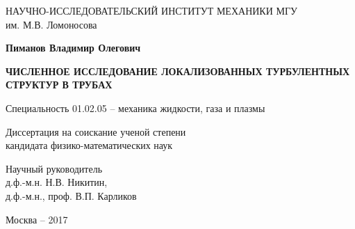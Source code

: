 \begin{titlepage}
\newpage

\begin{center}
НАУЧНО-ИССЛЕДОВАТЕЛЬСКИЙ ИНСТИТУТ МЕХАНИКИ МГУ \\
им. М.В. Ломоносова\\
\vspace{2cm}
\end{center}


\vspace{2.5cm}

\begin{center}
\textbf{Пиманов Владимир Олегович}
\end{center}

\vspace{1cm}

\begin{center}
\textbf{ЧИСЛЕННОЕ ИССЛЕДОВАНИЕ ЛОКАЛИЗОВАННЫХ 
ТУРБУЛЕНТНЫХ СТРУКТУР В ТРУБАХ}
\end{center}

\vspace{1.5cm}

\begin{center}
Специальность 01.02.05 -- механика жидкости, газа и плазмы\\

\vspace{1.0cm}

Диссертация на соискание ученой степени \\
кандидата физико-математических наук
\end{center}

\vspace{1cm}

\begin{flushright}
Научный руководитель \\
д.ф.-м.н. Н.В. Никитин,\\
д.ф.-м.н., проф. В.П. Карликов
\end{flushright}

\vspace{\fill}

\begin{center}
Москва -- 2017
\end{center}

\end{titlepage}
